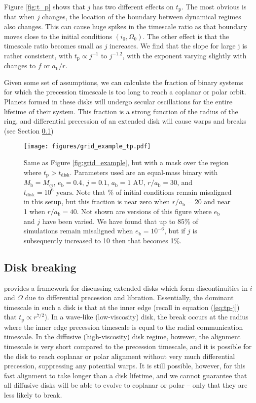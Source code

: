 \documentclass[twocolumn]{aastex631}
\begin{document}
Figure \ref{fig:t_p} shows that $j$ has two different effects on $t_\text{p}$. The most obvious is that when $j$ changes, the location of the boundary between dynamical regimes also changes. This can cause huge spikes in the timescale ratio as that boundary moves close to the initial conditions $(i_0, \Omega_0)$. The other effect is that the timescale ratio becomes small as $j$ increases. We find that the slope for large j is rather consistent, with $t_\text{p}\propto j^{-1} \text{ to } j^{-1.2}$, with the exponent varying slightly with changes to $f$ or $a_\text{b}/r$. 

Given some set of assumptions, we can calculate the fraction of binary systems for which the precession timescale is too long to reach a coplanar or polar orbit. Planets formed in these disks will undergo secular oscillations for the entire lifetime of their system. This fraction is a strong function of the radius of the ring, and differential precession of an extended disk will cause warps and breaks (see Section \ref{subsec:breaks})

\begin{figure}
    \texttt{[image: figures/grid\_example\_tp.pdf]}
    \caption{Same as Figure \ref{fig:grid_example}, but with a mask over the region where $t_\text{p} > t_\text{disk}$. Parameters used are an equal-mass binary with $M_\text{b} = M_\odot$, $e_\text{b} = 0.4$, $j=0.1$, $a_\text{b} = 1\text{ AU}$, $r/a_\text{b} = 30$, and $t_\text{disk} = 10^6 \text{ years}$. Note that \% of initial conditions remain misaligned in this setup, but this fraction is near zero when $r/a_\text{b} = 20$ and near 1 when $r/a_\text{b} = 40$. Not shown are versions of this figure where $e_\text{b}$ and $j$ have been varied. We have found that up to 85\% of simulations remain misaligned when $e_\text{b}=10^{-6}$, but if $j$ is subsequently increased to 10 then that becomes 1\%. }
    \label{fig:grid-tp}
\end{figure}

\subsection{Disk breaking}
\label{subsec:breaks}
\citet{rabago2024} provides a framework for discussing extended disks which form discontinuities in $i$ and $\Omega$ due to differential precession and libration. Essentially, the dominant timescale in such a disk is that at the inner edge (recall in equation (\ref{eq:tp-j}) that $t_\text{p} \propto r^{7/2}$).
In a wave-like (low-viscosity) disk, the break occurs at the radius where the inner edge precession timescale is equal to the radial communication timescale. In the diffusive (high-viscosity) disk regime, however, the alignment timescale is very short compared to the precession timescale, and it is possible for the disk to reach coplanar or polar alignment without very much differential precession, suppressing any potential warps. It is still possible, however, for this fast alignment to take longer than a disk lifetime, and we cannot guarantee that all diffusive disks will be able to evolve to coplanar or polar -- only that they are less likely to break.
\end{document}
